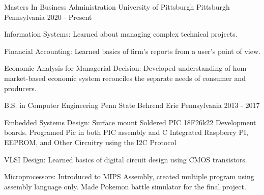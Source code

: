


\begin{cventries}

\cventry
{Masters In Business Administration} %
{University of Pittsburgh} %
{Pittsburgh Pennsylvania} %
{2020 - Present} %
{ %
\begin{cvitems}
\item {Information Systems: Learned about managing complex technical projects.}
\item {Financial Accounting: Learned basics of firm's reports from a user's point of view.}
\item {Economic Analysis for Managerial Decision: Developed understanding of hom market-based economic system reconciles the separate needs of consumer and producers.}
\end{cvitems}
}

\cventry
{B.S. in Computer Engineering} %
{Penn State Behrend} %
{Erie Pennsylvania} %
{2013 - 2017} %
{ %
\begin{cvitems}
\item {Embedded Systems Design: Surface mount Soldered PIC 18F26k22 Development boards. Programed Pic in both PIC assembly and C Integrated Raspberry PI, EEPROM, and Other Circuitry using the I2C Protocol}
\item {VLSI Design: Learned basics of digital circuit design using CMOS transistors.}
\item {Microprocessors: Introduced to MIPS Assembly, created multiple program using assembly language only. Made Pokemon battle simulator for the final project. }
\end{cvitems}
}


\end{cventries}